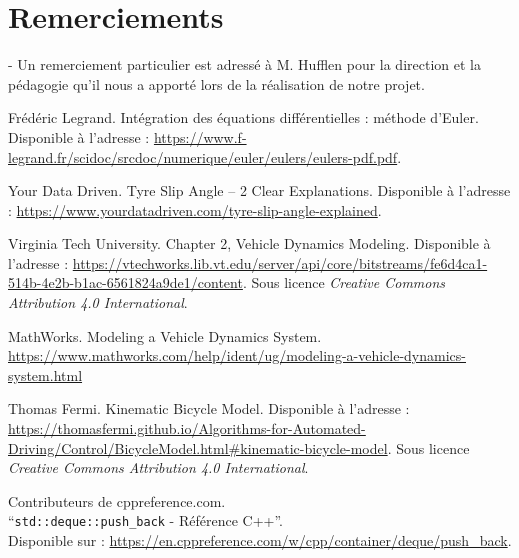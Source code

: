 \documentclass[a4paper,12pt]{report}
\begin{document}
    \newpage
    \section*{Remerciements}
    - Un remerciement particulier est adressé à M. Hufflen pour la direction et la pédagogie qu'il nous a apporté lors de la réalisation de notre projet.

    \newpage
    \tableofcontents

    \glsaddall
    \printglossaries
    \newpage

    
    
    
    


    \begin{thebibliography}{9}
        Frédéric Legrand.
        Intégration des équations différentielles : méthode d'Euler.
        Disponible à l'adresse : \url{https://www.f-legrand.fr/scidoc/srcdoc/numerique/euler/eulers/eulers-pdf.pdf}.

        Your Data Driven.
        Tyre Slip Angle – 2 Clear Explanations.
        Disponible à l'adresse : \url{https://www.yourdatadriven.com/tyre-slip-angle-explained}.

        Virginia Tech University.
        Chapter 2, Vehicle Dynamics Modeling.
        Disponible à l'adresse : \url{https://vtechworks.lib.vt.edu/server/api/core/bitstreams/fe6d4ca1-514b-4e2b-b1ac-6561824a9de1/content}.
        Sous licence \textit{Creative Commons Attribution 4.0 International}.

        MathWorks.
        Modeling a Vehicle Dynamics System.
        \url{https://www.mathworks.com/help/ident/ug/modeling-a-vehicle-dynamics-system.html}

        Thomas Fermi.
        Kinematic Bicycle Model.
        Disponible à l'adresse : \url{https://thomasfermi.github.io/Algorithms-for-Automated-Driving/Control/BicycleModel.html#kinematic-bicycle-model}.
        Sous licence \textit{Creative Commons Attribution 4.0 International}.

        Contributeurs de cppreference.com. \\
        ``\texttt{std::deque::push\_back} - Référence C++''. \\
        Disponible sur : \url{https://en.cppreference.com/w/cpp/container/deque/push_back}.


\end{thebibliography}
\end{document}
